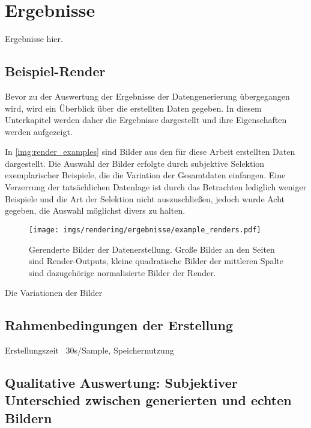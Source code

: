 
\section{Ergebnisse}
\label{sec:daten:ergebnisse}

Ergebnisse hier.

\subsection{Beispiel-Render}  %
\label{sec:render_beispiel}

Bevor zu der Auswertung der Ergebnisse der Datengenerierung übergegangen wird, wird ein Überblick über die erstellten Daten gegeben. In diesem Unterkapitel werden daher die Ergebnisse dargestellt und ihre Eigenschaften werden aufgezeigt.

In \autoref{img:render_examples} sind Bilder aus den für diese Arbeit erstellten Daten dargestellt. Die Auswahl der Bilder erfolgte durch subjektive Selektion exemplarischer Beispiele, die die Variation der Gesamtdaten einfangen. Eine Verzerrung der tatsächlichen Datenlage ist durch das Betrachten lediglich weniger Beispiele und die Art der Selektion nicht auszuschließen, jedoch wurde Acht gegeben, die Auswahl möglichst divers zu halten.

\begin{figure}
    \centering
    \texttt{[image: imgs/rendering/ergebnisse/example\_renders.pdf]}
    \caption{Gerenderte Bilder der Datenerstellung. Große Bilder an den Seiten sind Render-Outputs, kleine quadratische Bilder der mittleren Spalte sind dazugehörige normalisierte Bilder der Render.}
    \label{img:render_examples}
\end{figure}

Die Variationen der Bilder



\subsection{Rahmenbedingungen der Erstellung}  %
\label{sec:render_info}

Erstellungszeit ~30s/Sample, Speichernutzung

\todo{}

\subsection{Qualitative Auswertung: Subjektiver Unterschied zwischen generierten und echten Bildern}  %
\label{sec:rendering_qualitativ}

